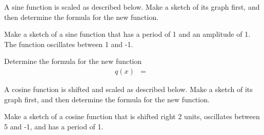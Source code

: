 \begin{problem}
\clearpage

\item A sine function is scaled as described below. Make a sketch of
  its graph first, and then determine the formula for the new
  function.
  \begin{subproblem}
  \item Make a sketch of a sine function that has a period of 1 and an
    amplitude of 1. The function oscillates between 1 and -1.

    \hspace*{-3.5em}


  \item Determine the formula for the new function
    \begin{eqnarray*}
        q(x) & = &
    \end{eqnarray*}
  \end{subproblem}

\item A cosine function is shifted and scaled as described
  below. Make a sketch of its graph first, and then determine the
  formula for the new function.
  \begin{subproblem}
  \item Make a sketch of a cosine function that is shifted right
    2 units, oscillates between 5 and -1, and has a period of 1.


\end{subproblem}
\end{problem}

